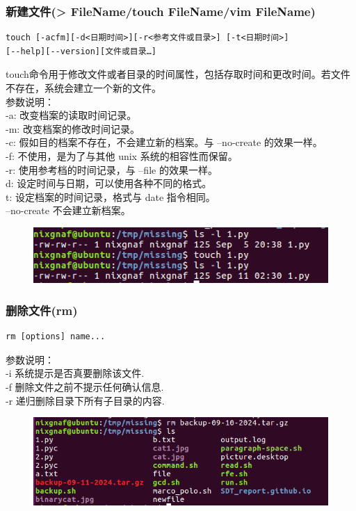 \documentclass{article}
\begin{document}
\subsubsection{新建文件(> FileName/touch FileName/vim FileName)}
\begin{lstlisting}[style=myStyle]
touch [-acfm][-d<日期时间>][-r<参考文件或目录>] [-t<日期时间>]
[--help][--version][文件或目录…]
\end{lstlisting}
touch命令用于修改文件或者目录的时间属性，包括存取时间和更改时间。若文件不存在，系统会建立一个新的文件。\\
参数说明：\\
-a: 改变档案的读取时间记录。\\
-m: 改变档案的修改时间记录。\\
-c: 假如目的档案不存在，不会建立新的档案。与 --no-create 的效果一样。\\
-f: 不使用，是为了与其他 unix 系统的相容性而保留。\\
-r: 使用参考档的时间记录，与 --file 的效果一样。\\
d: 设定时间与日期，可以使用各种不同的格式。\\
t: 设定档案的时间记录，格式与 date 指令相同。\\
--no-create 不会建立新档案。\\
\begin{figure}[h]
    \centering
    \includegraphics[width=0.5\linewidth]{image15.png}
\end{figure}

\subsubsection{删除文件(rm)}
\begin{lstlisting}[style=myStyle]
rm [options] name...
\end{lstlisting}
参数说明：\\
-i 系统提示是否真要删除该文件.\\
-f 删除文件之前不提示任何确认信息.\\
-r 递归删除目录下所有子目录的内容.\\
\begin{figure}[h]
    \centering
    \includegraphics[width=0.5\linewidth]{image16.png}
\end{figure}
\end{document}
